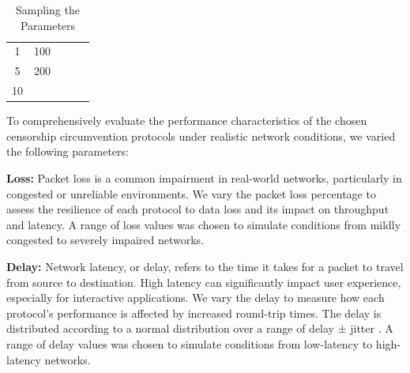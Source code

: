 \begin{table}[tbh]
\begin{tabular}{ccccc}
		\rowcolor[HTML]{EFEFEF}
		1                                                                & 100                                                               &                                                                    &                                                                       &                                                                             \\
		5                                                                & 200                                                               &                                                                    &                                                                       &                                                                             \\
		\rowcolor[HTML]{EFEFEF}
		10                                                               &                                                                   &                                                                    &                                                                       &                                                                             \\ \bottomrule
	\end{tabular}
	\caption{Sampling the Parameters}
	\label{tab:parameters}
\end{table}

To comprehensively evaluate the performance characteristics of the chosen censorship circumvention protocols under realistic network conditions, we varied the following parameters:

\noindent\textbf{Loss:} Packet loss is a common impairment in real-world networks, particularly in congested or unreliable environments.
We vary the packet loss percentage to assess the resilience of each protocol to data loss and its impact on throughput and latency.
A range of loss values was chosen to simulate conditions from mildly congested to severely impaired networks.

\noindent\textbf{Delay:} Network latency, or delay, refers to the time it takes for a packet to travel from source to destination.
High latency can significantly impact user experience, especially for interactive applications.
We vary the delay to measure how each protocol's performance is affected by increased round-trip times.
The delay is distributed according to a normal distribution over a range of delay ± jitter \cite{man8:tc-netem}.
A range of delay values was chosen to simulate conditions from low-latency to high-latency networks.

